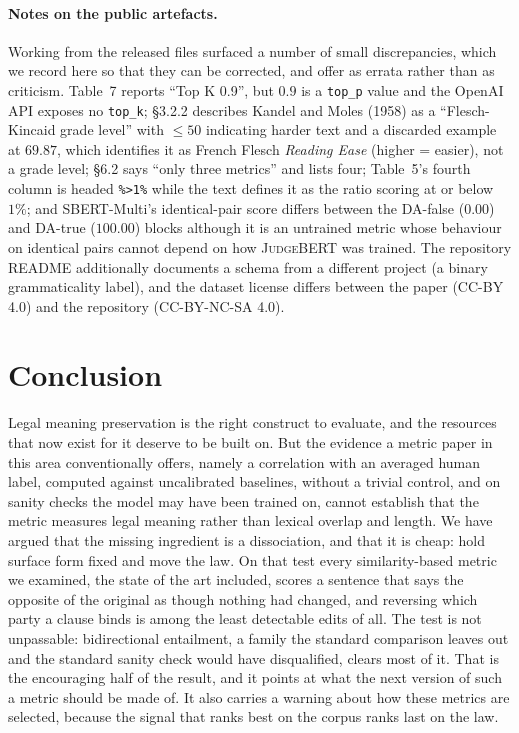 \documentclass[11pt]{article}
\begin{document}
\paragraph{Notes on the public artefacts.}
Working from the released files surfaced a number of small discrepancies, which
we record here so that they can be corrected, and offer as errata rather than as
criticism. Table~7 reports ``Top K 0.9'', but $0.9$ is a \texttt{top\_p} value
and the OpenAI API exposes no \texttt{top\_k}; \S3.2.2 describes Kandel and
Moles (1958) as a ``Flesch-Kincaid grade level'' with $\leq 50$ indicating
harder text and a discarded example at $69.87$, which identifies it as French
Flesch \emph{Reading Ease} (higher = easier), not a grade level; \S6.2 says
``only three metrics'' and lists four; Table~5's fourth column is headed
\texttt{\%>1\%} while the text defines it as the ratio scoring at or below
$1\%$; and SBERT-Multi's identical-pair score differs between the DA-false
($0.00$) and DA-true ($100.00$) blocks although it is an untrained metric whose
behaviour on identical pairs cannot depend on how \textsc{JudgeBERT} was
trained. The repository README additionally documents a schema from a different
project (a binary grammaticality label), and the dataset license differs between
the paper (CC-BY 4.0) and the repository (CC-BY-NC-SA 4.0).

\section{Conclusion}

Legal meaning preservation is the right construct to evaluate, and the resources
that now exist for it deserve to be built on. But the evidence a metric paper in
this area conventionally offers, namely a correlation with an averaged human
label, computed against uncalibrated baselines, without a trivial control, and
on sanity checks the model may have been trained on, cannot establish that the
metric measures legal meaning rather than lexical overlap and length. We have argued that the
missing ingredient is a dissociation, and that it is cheap: hold surface form
fixed and move the law. On that test every similarity-based metric we examined,
the state of the art included, scores a sentence that says the opposite of the
original as though nothing had changed, and reversing which party a clause binds
is among the least detectable edits of all. The test is not unpassable:
bidirectional entailment, a family the standard comparison leaves out and the
standard sanity check would have disqualified, clears most of it. That is the
encouraging half of the result, and it points at what the next version of such a
metric should be made of. It also carries a warning about how these metrics are
selected, because the signal that ranks best on the corpus ranks last on the
law.


\end{document}
